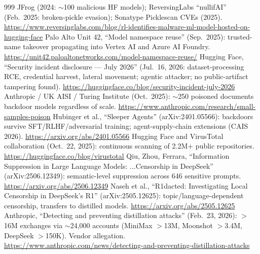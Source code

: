 \begin{thebibliography}{999}
 JFrog (2024: $\sim$100 malicious HF models); ReversingLabs ``nullifAI'' (Feb.\ 2025: broken-pickle evasion); Sonatype Picklescan CVEs (2025). \url{https://www.reversinglabs.com/blog/rl-identifies-malware-ml-model-hosted-on-hugging-face}
 Palo Alto Unit 42, ``Model namespace reuse'' (Sep.\ 2025): trusted-name takeover propagating into Vertex AI and Azure AI Foundry. \url{https://unit42.paloaltonetworks.com/model-namespace-reuse/}
 Hugging Face, ``Security incident disclosure --- July 2026'' (Jul.\ 16, 2026: dataset-processing RCE, credential harvest, lateral movement; agentic attacker; no public-artifact tampering found). \url{https://huggingface.co/blog/security-incident-july-2026}
 Anthropic / UK AISI / Turing Institute (Oct.\ 2025): $\sim$250 poisoned documents backdoor models regardless of scale. \url{https://www.anthropic.com/research/small-samples-poison}
 Hubinger et al., ``Sleeper Agents'' (arXiv:2401.05566): backdoors survive SFT/RLHF/adversarial training; agent-supply-chain extensions (CAIS 2026). \url{https://arxiv.org/abs/2401.05566}
 Hugging Face and VirusTotal collaboration (Oct.\ 22, 2025): continuous scanning of 2.2M+ public repositories. \url{https://huggingface.co/blog/virustotal}
 Qiu, Zhou, Ferrara, ``Information Suppression in Large Language Models: ...Censorship in DeepSeek'' (arXiv:2506.12349): semantic-level suppression across 646 sensitive prompts. \url{https://arxiv.org/abs/2506.12349}
 Naseh et al., ``R1dacted: Investigating Local Censorship in DeepSeek's R1'' (arXiv:2505.12625): topic/language-dependent censorship, transfers to distilled models. \url{https://arxiv.org/abs/2505.12625}
 Anthropic, ``Detecting and preventing distillation attacks'' (Feb.\ 23, 2026): $>$16M exchanges via $\sim$24,000 accounts (MiniMax $>$13M, Moonshot $>$3.4M, DeepSeek $>$150K). Vendor allegation. \url{https://www.anthropic.com/news/detecting-and-preventing-distillation-attacks}


\end{thebibliography}
